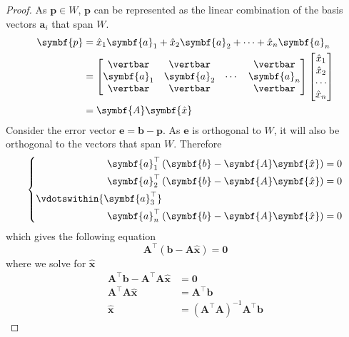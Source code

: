 \documentclass{article}
\begin{document}
\begin{proof}
    As \(\symbf{p}\in W\), \(\symbf{p}\) can be represented as the
    linear combination of the basis vectors \(\symbf{a}_i\) that span
    \(W\).
    \begin{align*}
        \symbf{p} & = \hat{x}_1 \symbf{a}_1 + \hat{x}_2 \symbf{a}_2 + \cdots + \hat{x}_n \symbf{a}_n \\
                  & =
        \begin{bmatrix}
            \vertbar    & \vertbar    &        & \vertbar    \\
            \symbf{a}_1 & \symbf{a}_2 & \cdots & \symbf{a}_n \\
            \vertbar    & \vertbar    &        & \vertbar
        \end{bmatrix}
        \begin{bmatrix}
            \hat{x}_1 \\
            \hat{x}_2 \\
            \cdots    \\
            \hat{x}_n
        \end{bmatrix}
        \\
                  & = \symbf{A}\symbf{\hat{x}}
    \end{align*}
    Consider the error vector \(\symbf{e}=\symbf{b}-\symbf{p}\).
    As \(\symbf{e}\) is orthogonal to \(W\), it will also be
    orthogonal to the vectors that span \(W\). Therefore
    \begin{equation*}
        \left\{
        \begin{aligned}
            \symbf{a}_1^\top\left( \symbf{b}-\symbf{A}\symbf{\hat{x}} \right)                         & = 0 \\
            \symbf{a}_2^\top\left( \symbf{b}-\symbf{A}\symbf{\hat{x}} \right)                         & = 0 \\
            \vdotswithin{\symbf{a}_3^\top}\phantom{\left( \symbf{b}-\symbf{A}\symbf{\hat{x}} \right)} &     \\
            \symbf{a}_n^\top\left( \symbf{b}-\symbf{A}\symbf{\hat{x}} \right)                         & = 0
        \end{aligned}
        \right.
    \end{equation*}
    which gives the following equation
    \begin{equation*}
        \symbf{A}^\top \left( \symbf{b}-\symbf{A}\symbf{\hat{x}} \right) = \symbf{0}
    \end{equation*}
    where we solve for \(\symbf{\hat{x}}\)
    \begin{align*}
        \symbf{A}^\top \symbf{b}-\symbf{A}^\top \symbf{A}\symbf{\hat{x}} & = \symbf{0}                                                            \\
        \symbf{A}^\top \symbf{A}\symbf{\hat{x}}                          & = \symbf{A}^\top \symbf{b}                                             \\
        \symbf{\hat{x}}                                                  & = \left( \symbf{A}^\top \symbf{A} \right)^{-1}\symbf{A}^\top \symbf{b}
    \end{align*}
\end{proof}
\end{document}
